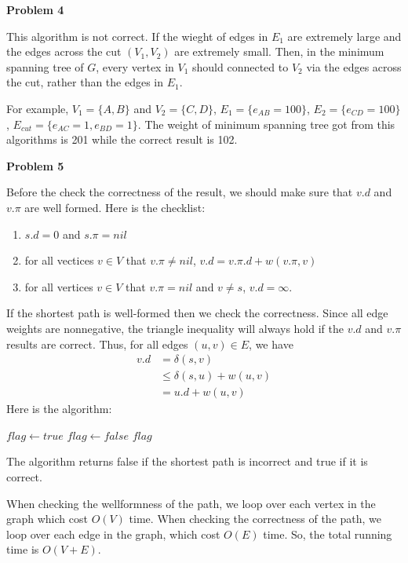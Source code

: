 \documentclass[12pt,letterpaper]{article}
\def\pp{\par\noindent}
\newcommand{\problem}[1]{ \bigskip \pp \textbf{Problem #1}\par}
\begin{document}
\problem{4}
This algorithm is not correct. If the wieght of edges in $E_1$ are extremely large and the edges across the cut $(V_1, V_2)$ are extremely small. Then, in the minimum spanning tree of $G$, every vertex in $V_1$ should connected to $V_2$ via the edges across the cut, rather than the edges in $E_1$.\par
For example, $V_1=\{A, B\}$ and $V_2=\{C, D\}$, $E_1=\{e_{AB}=100\}$, $E_2=\{e_{CD}=100\}$, $E_{cut}=\{e_{AC}=1, e_{BD}=1\}$. The weight of minimum spanning tree got from this algorithms is 201 while the correct result is 102.

\problem{5}
Before the check the correctness of the result, we should make sure that $v.d$ and $v.\pi$ are well formed. Here is the checklist:
\begin{enumerate}
	\item $s.d=0$ and $s.\pi=nil$
	\item for all vectices $v\in V$ that $v.\pi\neq nil$, $v.d=v.\pi.d+w(v.\pi,v)$
	\item for all vertices $v\in V$ that $v.\pi= nil$ and $v\neq s$, $v.d=\infty$.
\end{enumerate}\par
If the shortest path is well-formed then we check the correctness. Since all edge weights are nonnegative, the triangle inequality will always hold if the $v.d$ and $v.\pi$ results are correct. Thus, for all edges $(u,v)\in E$, we have
\begin{align*}
	v.d&=\delta(s,v)\\
	&\leq\delta(s,u)+w(u,v)\\
	&=u.d+w(u,v)
\end{align*}
Here is the algorithm:
\begin{algorithmic}[1]
	\STATE $flag \leftarrow true$
	\STATE $flag \leftarrow false$
	\ENDIF
	\ENDFOR
	\RETURN $flag$
\end{algorithmic}
The algorithm returns false if the shortest path is incorrect and true if it is correct.\par
When checking the wellformness of the path, we loop over each vertex in the graph which cost $O(V)$ time. When checking the correctness of the path, we loop over each edge in the graph, which cost $O(E)$ time. So, the total running time is $O(V+E)$.
\end{document}

